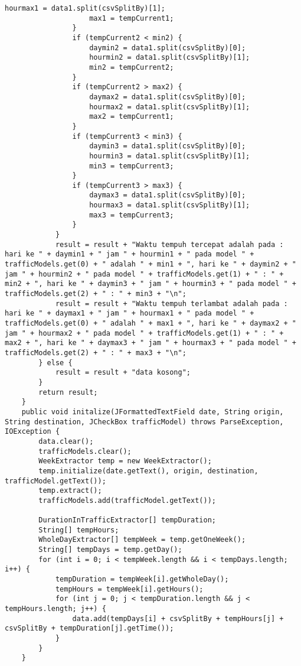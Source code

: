 \begin{lstlisting}[caption= DataProcessor.java]
                    hourmax1 = data1.split(csvSplitBy)[1];
                    max1 = tempCurrent1;
                }
                if (tempCurrent2 < min2) {
                    daymin2 = data1.split(csvSplitBy)[0];
                    hourmin2 = data1.split(csvSplitBy)[1];
                    min2 = tempCurrent2;
                }
                if (tempCurrent2 > max2) {
                    daymax2 = data1.split(csvSplitBy)[0];
                    hourmax2 = data1.split(csvSplitBy)[1];
                    max2 = tempCurrent1;
                }
                if (tempCurrent3 < min3) {
                    daymin3 = data1.split(csvSplitBy)[0];
                    hourmin3 = data1.split(csvSplitBy)[1];
                    min3 = tempCurrent3;
                }
                if (tempCurrent3 > max3) {
                    daymax3 = data1.split(csvSplitBy)[0];
                    hourmax3 = data1.split(csvSplitBy)[1];
                    max3 = tempCurrent3;
                }
            }
            result = result + "Waktu tempuh tercepat adalah pada : hari ke " + daymin1 + " jam " + hourmin1 + " pada model " + trafficModels.get(0) + " adalah " + min1 + ", hari ke " + daymin2 + " jam " + hourmin2 + " pada model " + trafficModels.get(1) + " : " + min2 + ", hari ke " + daymin3 + " jam " + hourmin3 + " pada model " + trafficModels.get(2) + " : " + min3 + "\n";
            result = result + "Waktu tempuh terlambat adalah pada : hari ke " + daymax1 + " jam " + hourmax1 + " pada model " + trafficModels.get(0) + " adalah " + max1 + ", hari ke " + daymax2 + " jam " + hourmax2 + " pada model " + trafficModels.get(1) + " : " + max2 + ", hari ke " + daymax3 + " jam " + hourmax3 + " pada model " + trafficModels.get(2) + " : " + max3 + "\n";
        } else {
            result = result + "data kosong";
        }
        return result;
    }
    public void initalize(JFormattedTextField date, String origin, String destination, JCheckBox trafficModel) throws ParseException, IOException {
        data.clear();
        trafficModels.clear();
        WeekExtractor temp = new WeekExtractor();
        temp.initialize(date.getText(), origin, destination, trafficModel.getText());
        temp.extract();
        trafficModels.add(trafficModel.getText());

        DurationInTrafficExtractor[] tempDuration;
        String[] tempHours;
        WholeDayExtractor[] tempWeek = temp.getOneWeek();
        String[] tempDays = temp.getDay();
        for (int i = 0; i < tempWeek.length && i < tempDays.length; i++) {
            tempDuration = tempWeek[i].getWholeDay();
            tempHours = tempWeek[i].getHours();
            for (int j = 0; j < tempDuration.length && j < tempHours.length; j++) {
                data.add(tempDays[i] + csvSplitBy + tempHours[j] + csvSplitBy + tempDuration[j].getTime());
            }
        }
    }


\end{lstlisting}
